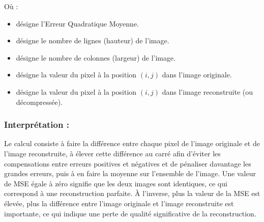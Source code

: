 Où :
\begin{itemize}
\item[\(MSE\):] désigne l'Erreur Quadratique Moyenne.
\item[\(P\):]  désigne le nombre de lignes (hauteur) de l'image.
\item[\(Q\):] désigne le nombre de colonnes (largeur) de l'image.
\item[\(I_{ij}\):] désigne la valeur du pixel à la position \((i,j)\) dans l'image originale.
\item[\(\hat{T}_{ij}\):] désigne la valeur du pixel à la position \((i,j)\) dans l'image reconstruite (ou décompressée).
\end{itemize}
\enlargethispage{\baselineskip}
\subsubsection*{Interprétation :}
Le calcul consiste à faire la différence entre chaque pixel de l'image originale et de l'image reconstruite, à élever cette différence au carré afin d'éviter les compensations entre erreurs positives et négatives et de pénaliser davantage les grandes erreurs, puis à en faire la moyenne sur l'ensemble de l'image.
Une valeur de MSE égale à zéro signifie que les deux images sont identiques, ce qui correspond à une reconstruction parfaite. À l'inverse, plus la valeur de la MSE est élevée, plus la différence entre l'image originale et l'image reconstruite est importante, ce qui indique une perte de qualité significative de la reconstruction.

